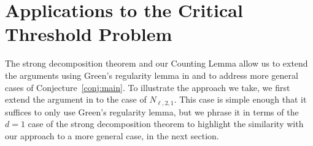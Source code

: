 \documentclass{article}
\theoremstyle{plain}
\theoremstyle{definition}
\theoremstyle{definition}
\theoremstyle{remark}
\numberwithin{equation}{section}
\begin{document}
\section{Applications to the Critical Threshold Problem} \label{sec:work}

The strong decomposition theorem and our Counting Lemma allow us to extend the arguments using Green's regularity lemma in \cite{main} and \cite{geelenOdd} to address more general cases of Conjecture~\ref{conj:main}. To illustrate the approach we take, we first extend the argument in \cite{main} to the case of $N_{\ell,2,1}$. This case is simple enough that it suffices to only use Green's regularity lemma, but we phrase it in terms of the $d=1$ case of the strong decomposition theorem to highlight the similarity with our approach to a more general case, in the next section.
\end{document}
